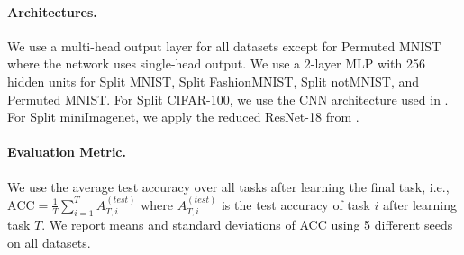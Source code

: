 

\vspace{-3mm}
\paragraph{Architectures.} We use a multi-head output layer for all datasets except for Permuted MNIST where the network uses single-head output. We use a 2-layer MLP with 256 hidden units for Split MNIST, Split FashionMNIST, Split notMNIST, and Permuted MNIST. For Split CIFAR-100, we use the CNN architecture used in . For Split miniImagenet, we apply the reduced ResNet-18 from . 

\vspace{-3mm}
\paragraph{Evaluation Metric.} We use the average test accuracy over all tasks after learning the final task, i.e., $\text{ACC} = \frac{1}{T} \sum_{i=1}^{T} A_{T, i}^{(test)}$ where $A_{T, i}^{(test)}$ is the test accuracy of task $i$ after learning task $T$. We report means and standard deviations of ACC using 5 different seeds on all datasets. 
















%













